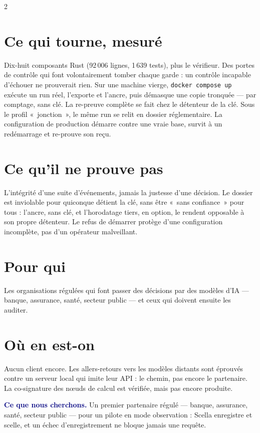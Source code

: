 \documentclass[10pt]{extarticle}
\newcommand{\code}[1]{\texttt{\footnotesize #1}}
\newcommand{\mm}[1]{\textbf{\textcolor{navy}{#1}}}
\begin{document}
\begin{multicols}{2}
\section{Ce qui tourne, mesuré}

Dix-huit composants Rust (92\,006 lignes, 1\,639 tests), plus le vérifieur. Des portes de contrôle qui font
volontairement tomber chaque garde : un contrôle incapable d'échouer ne prouverait rien. Sur une machine vierge,
\code{docker compose up} exécute un run réel, l'exporte et l'ancre, puis démasque une copie tronquée --- par
comptage, sans clé. La re-preuve complète se fait chez le détenteur de la clé. Sous le profil «~jonction~», le même run se relit
en dossier réglementaire. La configuration de production démarre contre une vraie base, survit à un
redémarrage et re-prouve son reçu.

\section{Ce qu'il ne prouve pas}

L'intégrité d'une suite d'événements, jamais la justesse d'une décision. Le dossier est inviolable pour quiconque
détient la clé, sans être «~sans confiance~» pour tous : l'ancre, sans clé, et l'horodatage tiers, en option, le
rendent opposable à son propre détenteur. Le refus de démarrer protège d'une configuration incomplète, pas d'un
opérateur malveillant.

\section{Pour qui}

Les organisations régulées qui font passer des décisions par des modèles d'IA --- banque, assurance,
santé, secteur public --- et ceux qui doivent ensuite les auditer.

\section{Où en est-on}

Aucun client encore. Les allers-retours vers les modèles distants sont éprouvés contre un serveur local qui imite
leur API : le chemin, pas encore le partenaire. La co-signature des nœuds de calcul est vérifiée, mais pas encore
produite.

\begin{acquis}
\mm{Ce que nous cherchons.} Un premier partenaire régulé --- banque, assurance, santé, secteur public --- pour un
pilote en mode observation : Scella enregistre et scelle, et un échec d'enregistrement ne bloque jamais une
requête.
\end{acquis}

\end{multicols}
\end{document}
